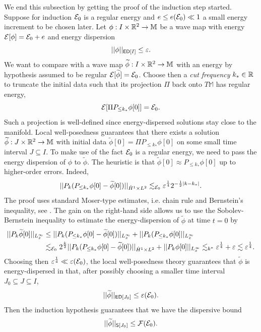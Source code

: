 We end this subsection by getting the proof of the induction step started. Suppose for induction $\mathcal E_0$ is a regular energy and $e \leq e(\mathcal E_0) \ll 1$ a small energy increment to be chosen later. Let $\phi : I \times \mathbb R^2 \to \mathbb M$ be a wave map with energy $\mathcal E[\phi] = \mathcal E_0 + e$ and energy dispersion 
	\[ ||\phi||_{\mathsf{ED}[I]} \leq \varepsilon.\]
We want to compare with a wave map $\widetilde \phi : I \times \mathbb R^2 \to \mathbb M$ with an energy by hypothesis assumed to be regular $\mathcal E[\widetilde \phi] = \mathcal E_0$. Choose then a \emph{cut frequency} $k_* \in \mathbb R$ to truncate the initial data  such that its projection $\Pi$ back onto $T\mathbb M$ has regular energy,
	\[ \mathcal E[\Pi P_{\leq k_*}  \phi[0]] = \mathcal E_0. \]
Such a projection is well-defined since energy-dispersed solutions stay close to the manifold. Local well-posedness guarantees that there exists a solution $\widetilde \phi : J \times \mathbb R^2 \to \mathbb M$ with initial data $\widetilde \phi[0] = \Pi P_{\leq k_*}  \phi[0]$ on some small time interval $J \subseteq I$. To make use of the fact $\mathcal E_0$ is a regular energy, we need to pass the energy dispersion of $\phi$ to $\widetilde \phi$. The heuristic is that $\widetilde \phi[0] \approx P_{\leq k_*} \phi[0]$ up to higher-order errors. Indeed, 
	\begin{equation}
		||P_k (P_{\leq k_*} \phi [0] - \widetilde \phi[0]) ||_{\dot H^1 \times L^2} \lesssim_{\mathcal E_0} \varepsilon^{\frac14} 2^{-\frac12 |k - k_*|}. \label{eq:seedzero}
	\end{equation}
The proof uses standard Moser-type estimates, i.e. chain rule and Bernstein's inequality, see \cite[Section 11]{SterbenzTataru2010}. The gain on the right-hand side allows us to use the Sobolev-Bernstein inequality to estimate the energy-dispersion of $\widetilde \phi$ at time $t = 0$ by 
	\begin{align*}
		||P_k \widetilde \phi [0]||_{L^\infty_x}
			&\leq ||P_k (P_{\leq k_*} \phi [0] - \widetilde \phi[0]) ||_{L^\infty_x} + ||P_k (P_{\leq k_*} \phi [0]||_{L^\infty_x} \\
			&\lesssim_{\mathcal E_0} 2^{\frac{k}{2}} ||P_k (P_{\leq k_*} \phi [0] - \widetilde \phi[0]) ||_{\dot H^1 \times L^2}  + ||P_k \phi[0]||_{L^\infty_x}\lesssim_{k^*} \varepsilon^{\frac14} + \varepsilon \lesssim \varepsilon^{\frac14}. 
	\end{align*}
Choosing then $\varepsilon^{\frac14} \ll \varepsilon (\mathcal E_0)$, the local well-posedness theory guarantees that $\widetilde \phi$ is energy-dispersed in that, after possibly choosing a smaller time interval $J_0 \subseteq J \subseteq I$,  
	\[ ||\widetilde\phi||_{\mathsf{ED}[J_0]} \leq \varepsilon (\mathcal E_0).  \]
Then the induction hypothesis guarantees that we have the dispersive bound
	\[ ||\widetilde \phi ||_{\mathsf S [J_0]} \leq \mathcal F (\mathcal E_0).  \]


